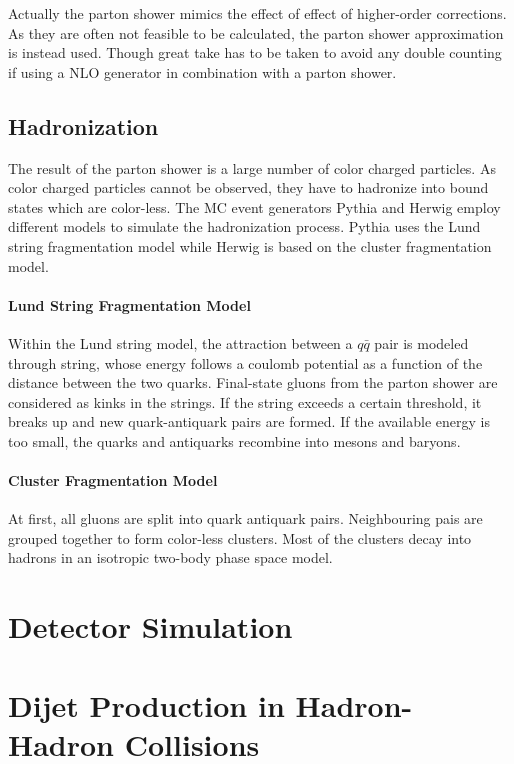 Actually the parton shower mimics the effect of effect of higher-order
corrections. As they are often not feasible to be calculated, the parton shower
approximation is instead used. Though great take has to be taken to avoid any
double counting if using a NLO generator in combination with a parton shower.


\subsection{Hadronization}

The result of the parton shower is a large number of color charged particles. As
color charged particles cannot be observed, they have to hadronize into bound
states which are color-less. The MC event generators Pythia and Herwig employ
different models to simulate the hadronization process. Pythia uses the Lund
string fragmentation model while Herwig is based on the cluster fragmentation
model.

\paragraph{Lund String Fragmentation Model}

Within the Lund string model, the attraction between a $q\bar q$ pair is
modeled through string, whose energy follows a coulomb potential as a function
of the distance between the two quarks. Final-state gluons from the parton
shower are considered as kinks in the strings. If the string exceeds a certain
threshold, it breaks up and new quark-antiquark pairs are formed. If the
available energy is too small, the quarks and antiquarks recombine into mesons
and baryons.

\paragraph{Cluster Fragmentation Model}

At first, all gluons are split into quark antiquark pairs. Neighbouring pais are
grouped together to form color-less clusters. Most of the clusters decay into
hadrons in an isotropic two-body phase space model.

\section{Detector Simulation}

\section{Dijet Production in Hadron-Hadron Collisions}

